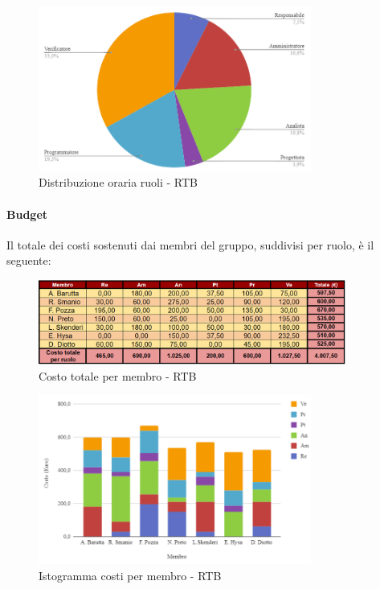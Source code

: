 \begin{figure}[H]
    \centering
    \includegraphics[width=0.8\textwidth]{../Images/distribuzioneOrariaRTBRuoli.png}
    \caption{Distribuzione oraria ruoli - RTB}
    \label{fig:GraficoDistribuzioneOreRTB}
\end{figure}

\vspace{0.6cm}

\paragraph{Budget}
Il totale dei costi sostenuti dai membri del gruppo, suddivisi per ruolo, è il seguente:
\begin{figure}[H]
    \centering
    \includegraphics[width=0.9\textwidth]{../Images/RiepilogoPrezziRTB.png}
    \caption{Costo totale per membro - RTB}
    \label{fig:CostiRTB}
\end{figure}
\begin{figure}[H]
    \centering
    \includegraphics[width=0.8\textwidth]{../Images/graficoCostoRuoloRTB.png}
    \caption{Istogramma costi per membro - RTB}
    \label{fig:GraficoCostoRTB}
\end{figure}

